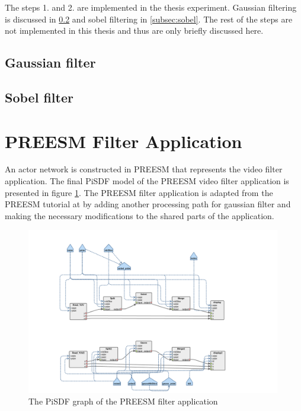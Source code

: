 The steps 1. and 2. are implemented in the thesis experiment. Gaussian filtering
is discussed in \ref{subsec:gauss} and sobel filtering in \ref{subsec:sobel}.
The rest of the steps are not implemented in this thesis and thus are only
briefly discussed here.

\subsection{Gaussian filter}
\label{subsec:gauss}
\subsection{Sobel filter}
\label{subsec:gauss}
\section{PREESM Filter Application}
\label{sec:preesmapp}
An actor network is constructed in PREESM that represents the video filter
application. The final PiSDF model of the PREESM video filter application is
presented in figure \ref{preesm_actors}. The PREESM filter application is
adapted from the PREESM tutorial at \cite{preesmtut} by adding another
processing path for gaussian filter and making the necessary modifications to
the shared parts of the application.

\begin{figure}[h!] \label{preesm_actors} \begin{center}
    \includegraphics[width=0.99\textwidth]{images/preesm_diagram.png}
    \caption{The PiSDF graph of the PREESM filter application} \end{center}
\end{figure}

